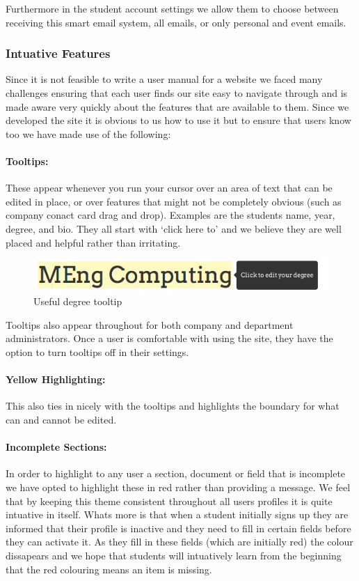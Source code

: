     Furthermore in the student account settings we allow them to choose between receiving this smart email system, all emails, or only personal and event emails.

  \subsubsection{Intuative Features}
    Since it is not feasible to write a user manual for a website we faced many challenges ensuring that each user finds our site easy to navigate through and is made aware very quickly about the features that are available to them. Since we developed the site it is obvious to us how to use it but to ensure that users know too we have made use of the following:

    \paragraph{Tooltips:} These appear whenever you run your cursor over an area of text that can be edited in place, or over features that might not be completely obvious (such as company conact card drag and drop). Examples are the students name, year, degree, and bio. They all start with `click here to' and we believe they are well placed and helpful rather than irritating.      
    \begin{figure}[H]\centering
    \includegraphics[scale=0.5]{images/design/edit_degree_tooltip}
    \caption{Useful degree tooltip}
    \end{figure}
    Tooltips also appear throughout for both company and department administrators.
    Once a user is comfortable with using the site, they have the option to turn tooltips off in their settings.

    \paragraph{Yellow Highlighting:} This also ties in nicely with the tooltips and highlights the boundary for what can and cannot be edited.

    \paragraph{Incomplete Sections:} In order to highlight to any user a section, document or field that is incomplete we have opted to highlight these in red rather than providing a message. We feel that by keeping this theme consistent throughout all users profiles it is quite intuative in itself.
    Whats more is that when a student initially signs up they are informed that their profile is inactive and they need to fill in certain fields before they can activate it. As they fill in these fields (which are initially red) the colour dissapears and we hope that students will intuatively learn from the beginning that the red colouring means an item is missing.

